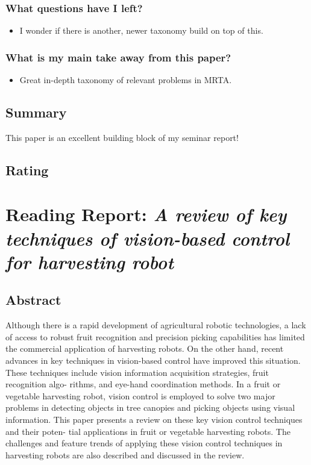 \subsubsection*{What questions have I left?}
\begin{itemize}
    \item I wonder if there is another, newer taxonomy build on top of this.
\end{itemize}
\subsubsection*{What is my main take away from this paper?}
\begin{itemize}
    \item Great in-depth taxonomy of relevant problems in MRTA.
\end{itemize}

\subsection*{Summary}
This paper is an excellent building block of my seminar report!
\subsection*{Rating}



\section{Reading Report: \emph{A review of key techniques of vision-based control for harvesting robot}}
\cite{Zhao2016}

\subsection*{Abstract}
Although there is a rapid development of agricultural robotic technologies, a lack of access to robust fruit
recognition and precision picking capabilities has limited the commercial application of harvesting
robots. On the other hand, recent advances in key techniques in vision-based control have improved this
situation. These techniques include vision information acquisition strategies, fruit recognition algo-
rithms, and eye-hand coordination methods. In a fruit or vegetable harvesting robot, vision control is
employed to solve two major problems in detecting objects in tree canopies and picking objects using
visual information. This paper presents a review on these key vision control techniques and their poten-
tial applications in fruit or vegetable harvesting robots. The challenges and feature trends of applying
these vision control techniques in harvesting robots are also described and discussed in the review.


